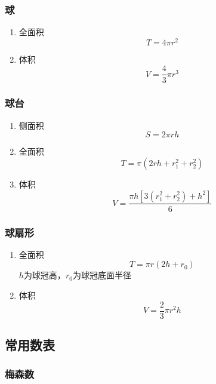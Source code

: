 \documentclass[a4paper]{article}
\begin{document}
\subsubsection{球}

\begin{enumerate}
	\item 全面积
		$$T=4\pi r^2$$
	\item 体积
		$$V=\frac{4}{3}\pi r^3$$
\end{enumerate}

\subsubsection{球台}

\begin{enumerate}
	\item 侧面积
		$$S=2\pi rh$$
	\item 全面积
		$$T=\pi(2rh+r_1^2+r_2^2)$$
	\item 体积
		$$V=\frac{\pi h[3(r_1^2+r_2^2)+h^2]}{6}$$
\end{enumerate}

\subsubsection{球扇形}

\begin{enumerate}
	\item 全面积
		$$T=\pi r(2h+r_0)$$
		$h$为球冠高，$r_0$为球冠底面半径
	\item 体积
		$$V=\frac{2}{3}\pi r^2h$$
\end{enumerate}

\subsection{常用数表}

\subsubsection{梅森数}
\end{document}
